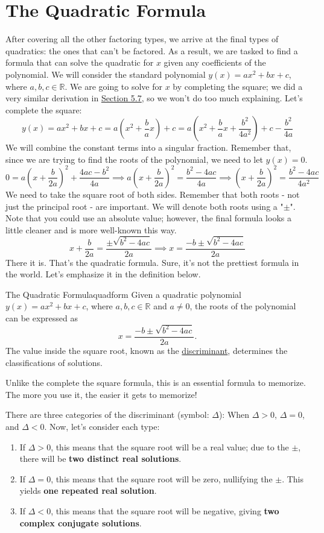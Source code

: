 \documentclass[../book.tex]{subfiles}
\begin{document}
\section{The Quadratic Formula}
\noindent After covering all the other factoring types, we arrive at the final types of quadratics: the ones that can't be factored.  As a result, we are tasked to find a formula that can solve the quadratic for $x$ given any coefficients of the polynomial.  We will consider the standard polynomial $y(x)=ax^2+bx+c$, where $a,b,c\in\mathbb{R}$.  We are going to solve for $x$ by completing the square; we did a very similar derivation in \hyperlink{section.5.7}{Section 5.7}, so we won't do too much explaining.  Let's complete the square:
$$y(x)=ax^2+bx+c=a\left(x^2+\frac{b}{a}x\right)+c=a\left(x^2+\frac{b}{a}x+\frac{b^2}{4a^2}\right)+c-\frac{b^2}{4a}$$
We will combine the constant terms into a singular fraction.  Remember that, since we are trying to find the roots of the polynomial, we need to let $y(x)=0$.
$$0=a\left(x+\frac{b}{2a}\right)^2+\frac{4ac-b^2}{4a} \implies a\left(x+\frac{b}{2a}\right)^2=\frac{b^2-4ac}{4a} \implies \left(x+\frac{b}{2a}\right)^2=\frac{b^2-4ac}{4a^2}$$
We need to take the square root of both sides.  Remember that both roots - not just the principal root - are important.  We will denote both roots using a "$\pm$".  Note that you could use an absolute value; however, the final formula looks a little cleaner and is more well-known this way.
$$x+\frac{b}{2a}=\frac{\pm\sqrt{b^2-4ac}}{2a} \implies x=\frac{-b\pm\sqrt{b^2-4ac}}{2a}$$
There it is.  That's the quadratic formula.  Sure, it's not the prettiest formula in the world.  Let's emphasize it in the definition below.
\begin{definition}{The Quadratic Formula}{quadform}
Given a quadratic polynomial $y(x)=ax^2+bx+c$, where $a,b,c\in\mathbb{R}$ and $a\neq 0$, the roots of the polynomial can be expressed as $$x=\frac{-b\pm\sqrt{b^2-4ac}}{2a}.$$
The value inside the square root, known as the \underline{discriminant}, determines the classifications of solutions.
\end{definition}
\begin{remark}
  Unlike the complete the square formula, this is an essential formula to memorize.  The more you use it, the easier it gets to memorize!
\end{remark}
There are three categories of the discriminant (symbol: $\Delta$): When $\Delta>0$, $\Delta=0$, and $\Delta<0$.  Now, let's consider each type: \begin{enumerate}
    \item If $\Delta>0$, this means that the square root will be a real value; due to the $\pm$, there will be \textbf{two distinct real solutions}.
    \item If $\Delta=0$, this means that the square root will be zero, nullifying the $\pm$.  This yields \textbf{one repeated real solution}.
    \item If $\Delta<0$, this means that the square root will be negative, giving \textbf{two complex conjugate solutions}.
\end{enumerate}
\end{document}

